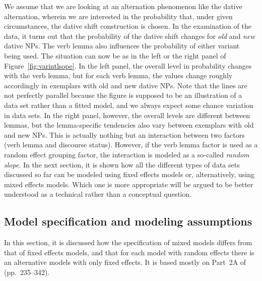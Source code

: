 \documentclass[a4paper,12pt]{article}
\begin{document}
We assume that we are looking at an alternation phenomenon like the dative alternation, wherein we are interested in the probability that, under given circumstances, the dative shift construction is chosen.
In the examination of the data, it turns out that the probability of the dative shift changes for \textit{old} and \textit{new} dative NPs.
The verb lemma also influences the probability of either variant being used.
The situation can now be as in the left or the right panel of Figure~\ref{fig:varintlsope}.
In the left panel, the overall level in probability changes with the verb lemma, but for each verb lemma, the values change roughly accordingly in exemplars with old and new dative NPs.
Note that the lines are not perfectly parallel because the figure is supposed to be an illustration of a data set rather than a fitted model, and we always expect some chance variation in data sets.
In the right panel, however, the overall levels are different between lemmas, but the lemma-specific tendencies also vary between exemplars with old and new NPs.
This is actually nothing but an interaction between two factors (verb lemma and discourse status).
However, if the verb lemma factor is used as a random effect grouping factor, the interaction is modeled as a so-called \textit{random slope}.
In the next section, it is shown how all the different types of data sets discussed so far can be modeled using fixed effects models or, alternatively, using mixed effects models.
Which one is more appropriate will be argued to be better understood as a technical rather than a conceptual question.

\subsection{Model specification and modeling assumptions}
\label{sec:modelspecificationandmodelingassumptions}

In this section, it is discussed how the specification of mixed models differs from that of fixed effects models, and that for each model with random effects there is an alternative models with only fixed effects.
It is based mostly on Part~2A of \citet{GelmanHill2006} (pp.~235--342).
\end{document}
